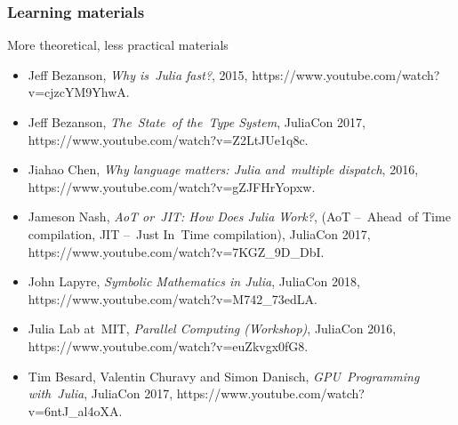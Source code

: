 \documentclass[10pt,t]{beamer}
\begin{document}
\begin{frame}
  \frametitle{Learning materials}


  {More theoretical, less practical materials}
  \begin{itemize}

  \item Jeff Bezanson, \textit{Why is~Julia fast?}, 2015,
    {https://www.youtube.com/watch?v=cjzcYM9YhwA}.

  \item Jeff Bezanson, \textit{The~State~of the~Type System},
    JuliaCon 2017,
    {https://www.youtube.com/watch?v=Z2LtJUe1q8c}.

  \item Jiahao Chen, \textit{Why language matters: Julia
      and~multiple dispatch}, 2016,
    {https://www.youtube.com/watch?v=gZJFHrYopxw}.

  \item Jameson Nash, \textit{AoT or~JIT: How Does Julia Work?},
    (AoT --~Ahead~of Time compilation, JIT --~Just In~Time
    compilation), JuliaCon 2017,
    {https://www.youtube.com/watch?v=7KGZ\_9D\_DbI}.

  \item John Lapyre, \textit{Symbolic Mathematics in Julia},
    JuliaCon 2018,
    {https://www.youtube.com/watch?v=M742\_73edLA}.

  \item Julia Lab at~MIT, \textit{Parallel Computing (Workshop)},
    JuliaCon 2016,
    {https://www.youtube.com/watch?v=euZkvgx0fG8}.

  \item Tim Besard, Valentin Churavy and Simon Danisch,
    \textit{GPU~Programming with~Julia}, JuliaCon 2017,
    {https://www.youtube.com/watch?v=6ntJ\_al4oXA}.

  \end{itemize}

\end{frame}
\end{document}
